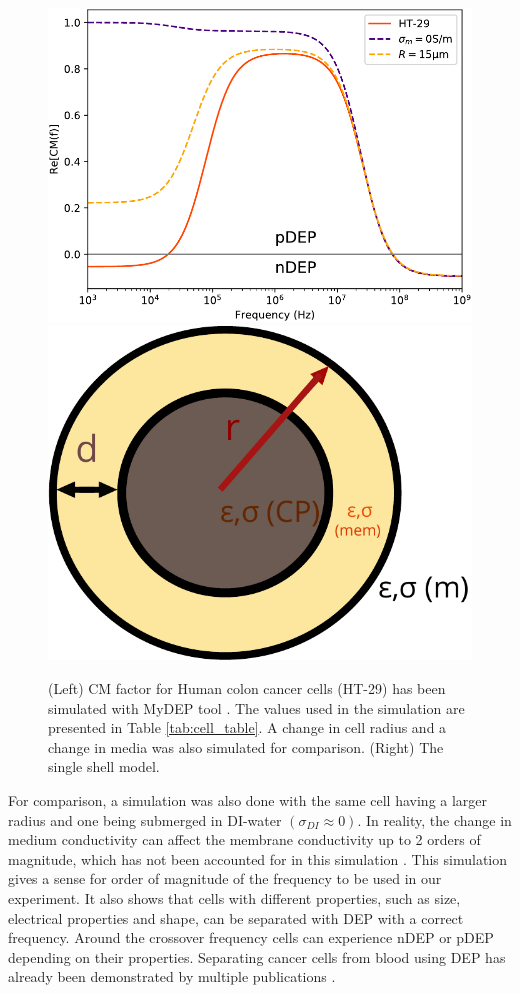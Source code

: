 \documentclass[final]{jyflluk}
\begin{document}
\begin{figure}[h]%
    \centering
    \includegraphics[width=.70\linewidth]{images/plot_DEP2.pdf}\quad\includegraphics[width=.27\linewidth]{images/single_shell.pdf}
    \qquad
    \begin{minipage}{1.2in}
    \end{minipage}%
    \caption{(Left) CM factor for Human colon cancer cells (HT-29) has been simulated with MyDEP tool \cite{cottet_mydep_2019}. The values used in the simulation are presented in Table \ref{tab:cell_table}. A change in cell radius and a change in media was also simulated for comparison. (Right) The single shell model.}%
    \label{fig:single_shell}%
\end{figure}


For comparison, a simulation was also done with the same cell having a larger radius and one being submerged in DI-water $(\sigma_{DI}\approx0)$. In reality, the change in medium conductivity can affect the membrane conductivity up to 2 orders of magnitude, which has not been accounted for in this simulation \cite{wu_dielectrophoretic_2012}. This simulation gives a sense for order of magnitude of the frequency to be used in our experiment. It also shows that cells with different properties, such as size, electrical properties and shape, can be separated with DEP with a correct frequency. Around the crossover frequency cells can experience nDEP or pDEP depending on their properties. Separating cancer cells from blood using DEP has already been demonstrated by multiple publications \cite{huang_enrichment_2013,kang_continuous_2006,becker_separation_1995, ivory_direct_2011}.
\end{document}
